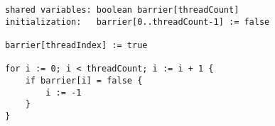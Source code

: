\begin{lstlisting}[mathescape]
shared variables: boolean barrier[threadCount]
initialization:   barrier[0..threadCount-1] := false

barrier[threadIndex] := true

for i := 0; i < threadCount; i := i + 1 {
	if barrier[i] = false {
		i := -1
	}
}
\end{lstlisting}
